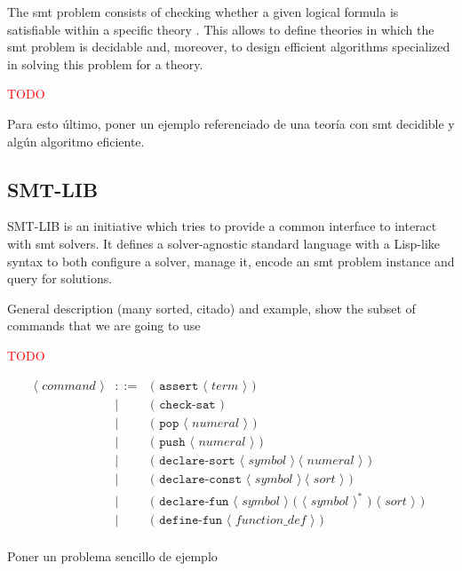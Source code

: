 The \gls{smt} problem consists of checking whether
a given logical formula is satisfiable within a specific theory
\citep{smtLibStandard}. This allows to define theories in which the \gls{smt} problem
is decidable and, moreover, to design efficient algorithms specialized in 
solving this problem for a theory.

\textcolor{red}{TODO}

Para esto último, poner un ejemplo referenciado de una teoría con \gls{smt} decidible y algún 
algoritmo eficiente.

\subsection{SMT-LIB}

SMT-LIB is an initiative which tries to provide a common interface to interact
with \acrshort{smt} solvers. It defines a solver-agnostic standard language
with a Lisp-like syntax to both configure a solver, manage it, encode an
\gls{smt} problem instance and query for solutions.

General description (many sorted, citado) and example, show the subset of commands that we are going to use

\textcolor{red}{TODO}

\[
\begin{array}{rcll}
\langle\textit{ command }\rangle & ::= & \texttt{( assert } \langle\textit{ term }\rangle\texttt{ ) }\\
& | & \texttt{( check-sat )}\\
& | & \texttt{( pop } \langle\textit{ numeral }\rangle \texttt{ ) }\\
& | & \texttt{( push } \langle\textit{ numeral }\rangle \texttt{ ) }\\
& | & \texttt{( declare-sort } \langle\textit{ symbol }\rangle~\langle\textit{ numeral }\rangle\texttt{ ) }\\
& | & \texttt{( declare-const } \langle\textit{ symbol }\rangle~\langle\textit{ sort }\rangle\texttt{ ) }\\
& | & \texttt{( declare-fun } \langle\textit{ symbol }\rangle \texttt{ ( }\langle\textit{ symbol }\rangle^* \texttt{ ) }\langle\textit{ sort }\rangle\texttt{ ) }\\
& | & \texttt{( define-fun } \langle\textit{ function\_def }\rangle\texttt{ ) }\\
\end{array}
\]

Poner un problema sencillo de ejemplo

